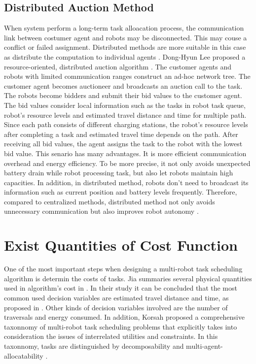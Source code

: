 \subsection{Distributed Auction Method}
\label{sec:auction_method}
When system perform a long-term task alloacation process, the communication link between costumer agent and robots may be disconnected. This may couse a conflict or failed assignment. 
Distributed methods are more suitable in this case as distribute the computation to individual agents \cite{NUNES201755}. 
Dong-Hyun Lee proposed a resource-oriented, distributed auction algorithm \cite{Dong2015}. 
The customer agents and robots with limited communication ranges construct an ad-hoc network tree. The customer agent becomes auctioneer and broadcasts an auction call to the task. The robots become bidders and submit their bid values to the customer agent. The bid values consider local information such as the tasks in robot task queue, robot's resource levels and estimated travel distance and time for multiple path. 
Since each path consists of different charging stations, the robot's resource levels after completing a task and estimated travel time depends on the path. 
After receiving all bid values, the agent assigns the task to the robot with the lowest bid value. 
This senario has many advantages. It is more efficient communication overhead and energy efficiency. To be more precise, it not only avoids unexpected battery drain while robot processing task, but also let robots maintain high capacities. In addition, in distributed method, robots don't need to broadcast its information such as current position and battery levels frequently. Therefore, compared to centralized methods, distributed method not only avoids unnecessary communication but also improves robot autonomy \cite{Shah07}.


\section{Exist Quantities of Cost Function}
\label{sec:cost_function}
One of the most important steps when designing a multi-robot task scheduling algorithm is determin the costs of tasks. Jia summaries several physical quantities used in algorithm's cost in \cite{Jia2013ASA}. In their study it can be concluded that the most common used decision variables are estimated travel distance and time, as proposed in \cite{Dong2015}. Other kinds of decision variables involved are the number of traversals and energy consumed. 
In addition, Korsah proposed a comprehensive taxonnomy of multi-robot task scheduling problems that explicitly takes into consideration the issues of interrelated utilities and constraints. In this taxonnomy, tasks are distinguished by decomposability and multi-agent-allocatability \cite{Korsah13}.
